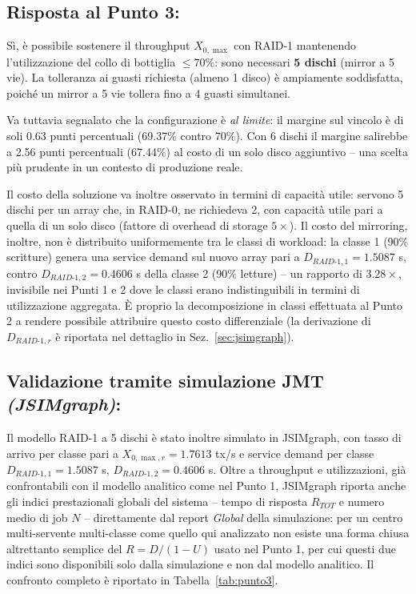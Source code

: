 \documentclass[11pt,a4paper]{article}
\begin{document}
\subsection{Risposta al Punto 3:}
\label{sec:raid1-fattibilita}
Sì, è possibile sostenere il throughput $X_{0,\max}$ con RAID-1 mantenendo l'utilizzazione
del collo di bottiglia $\le 70\%$: sono necessari \textbf{5 dischi} (mirror a 5 vie). La tolleranza ai
guasti richiesta (almeno 1 disco) è ampiamente soddisfatta, poiché un mirror a 5 vie tollera fino a
4 guasti simultanei.

Va tuttavia segnalato che la configurazione è \emph{al limite}: il margine sul vincolo è di soli 0.63
punti percentuali (69.37\% contro 70\%). Con 6 dischi il margine salirebbe a 2.56 punti percentuali
(67.44\%) al costo di un solo disco aggiuntivo -- una scelta più prudente in un contesto di
produzione reale.

Il costo della soluzione va inoltre osservato in termini di capacità utile: servono 5 dischi per un
array che, in RAID-0, ne richiedeva 2, con capacità utile pari a quella di un solo disco (fattore di
overhead di storage $5\times$). Il costo del mirroring, inoltre, non è distribuito uniformemente tra
le classi di workload: la classe 1 (90\% scritture) genera una service demand sul nuovo array
pari a $D_{RAID\text{-}1,1}=1.5087$ s, contro $D_{RAID\text{-}1,2}=0.4606$ s della classe 2 (90\%
letture) -- un rapporto di $3.28\times$, invisibile nei Punti 1 e 2 dove le classi erano
indistinguibili in termini di utilizzazione aggregata. È proprio la decomposizione in classi
effettuata al Punto 2 a rendere possibile attribuire questo costo differenziale (la derivazione di
$D_{RAID\text{-}1,r}$ è riportata nel dettaglio in Sez.~\ref{sec:jsimgraph}).

\subsection{Validazione tramite simulazione JMT \textit{(JSIMgraph)}:}

Il modello RAID-1 a 5 dischi è stato inoltre simulato in JSIMgraph, con tasso di arrivo per classe
pari a $X_{0,\max,r}=1.7613$ tx/s e service demand per classe $D_{RAID\text{-}1,1}=1.5087$ s,
$D_{RAID\text{-}1,2}=0.4606$ s. Oltre a throughput e utilizzazioni, già confrontabili con il modello
analitico come nel Punto 1, JSIMgraph riporta anche gli indici prestazionali globali del sistema --
tempo di risposta $R_{TOT}$ e numero medio di job $N$ -- direttamente dal report \emph{Global} della
simulazione: per un centro multi-servente multi-classe come quello qui analizzato non esiste una
forma chiusa altrettanto semplice del $R=D/(1-U)$ usato nel Punto 1, per cui questi due indici sono
disponibili solo dalla simulazione e non dal modello analitico. Il confronto completo è riportato in
Tabella~\ref{tab:punto3}.
\end{document}
